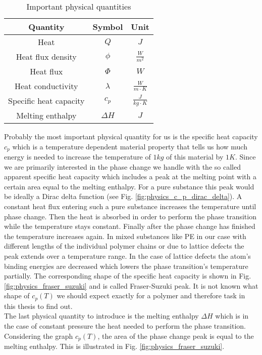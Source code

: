 \documentclass{scrartcl}[12pt, halfparskip]
\begin{document}
\begin{table}[H]
	\centering
\begin{tabular}{| c | c | c |} \hline
	Quantity & Symbol & Unit \\ \hline
	Heat & $Q$ & $J$ \\[0.7ex]
	Heat flux density & $\phi$ & $\frac{W}{m^2}$ \\[0.7ex]
	Heat flux & $\varPhi$ & $W$ \\[0.7ex]
	Heat conductivity & $\lambda$ & $\frac{W}{m \cdot K}$ \\[0.7ex]
	Specific heat capacity & $c_p$ & $\frac{J}{kg \cdot K}$ \\[0.7ex]
	Melting enthalpy & $\Delta H$ & $J$ \\ \hline
\end{tabular}
\caption{Important physical quantities}
\label{tab:important_physical_quantities}
\end{table}



Probably the most important physical quantity for us is the specific heat capacity $c_p$ which is a temperature dependent material property that tells us how much energy is needed to increase the temperature of $1kg$ of this material by $1K$. Since we are primarily interested in the phase change we handle with the so called apparent specific heat capacity which includes a peak at the melting point with a certain area equal to the melting enthalpy. For a pure substance this peak would be ideally a Dirac delta function (see Fig. \ref{fig:physics_c_p_dirac_delta}). A constant heat flux entering such a pure substance increases the temperature until phase change. Then the heat is absorbed in order to perform the phase transition while the temperature stays constant. Finally after the phase change has finished the temperature increases again. 
In mixed substances like PE in our case with different lengths of the individual polymer chains or due to lattice defects the peak extends over a temperature range. In the case of lattice defects the atom's binding energies are decreased which lowers the phase transition's temperature partially. The corresponding shape of the specific heat capacity is shown in Fig. \ref{fig:physics_fraser_suzuki} and is called Fraser-Suzuki peak. It is not known what shape of $c_p(T)$ we should expect exactly for a polymer and therefore task in this thesis to find out. \\
The last physical quantity to introduce is the melting enthalpy $\Delta H$ which is in the case of constant pressure the heat needed to perform the phase transition. Considering the graph $c_p(T)$, the area of the phase change peak is equal to the melting enthalpy. This is illustrated in Fig. \ref{fig:physics_fraser_suzuki}.
\end{document}
